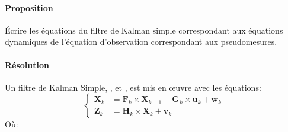 \documentclass{article}
\begin{document}
\paragraph{Proposition}Écrire les équations du filtre de Kalman simple correspondant aux équations dynamiques de l'équation d'observation correspondant aux pseudomesures.

\paragraph{Résolution}Un filtre de Kalman Simple, \cite{kalmanFilterWiki}, \cite{kalmanFilterMATLAB} et \cite{kalmanFilterMonashUniversity}, est mis en œuvre avec les équations:
\begin{equation*}
    \begin{cases}
        \mathbf{X}_{k} &= \mathbf{F}_{k} \times \mathbf{X}_{k-1} + \mathbf{G}_{k} \times \mathbf{u}_{k} + \mathbf{w}_{k}\\
        \mathbf{Z}_{k} &= \mathbf{H}_{k} \times \mathbf{X}_{k} + \mathbf{v}_{k}
    \end{cases}
\end{equation*}
Où:
\end{document}
